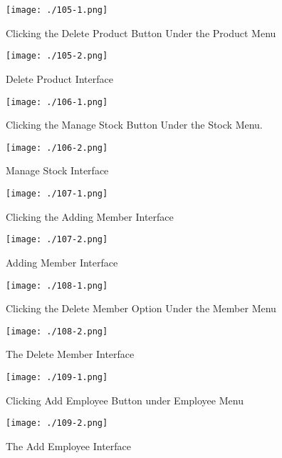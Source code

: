 \begin{figure}[H]
    \texttt{[image: ./105-1.png]}
    \caption{Clicking the Delete Product Button Under the Product Menu} \label{fig:105-1}
\end{figure}

\begin{figure}[H]
    \texttt{[image: ./105-2.png]}
    \caption{Delete Product Interface} \label{fig:105-2}
\end{figure}

\begin{figure}[H]
    \texttt{[image: ./106-1.png]}
    \caption{Clicking the Manage Stock Button Under the Stock Menu.} \label{fig:106-1}
\end{figure}

\begin{figure}[H]
    \texttt{[image: ./106-2.png]}
    \caption{Manage Stock Interface} \label{fig:106-2}
\end{figure}

\begin{figure}[H]
    \texttt{[image: ./107-1.png]}
    \caption{Clicking the Adding Member Interface} \label{fig:107-1}
\end{figure}

\begin{figure}[H]
    \texttt{[image: ./107-2.png]}
    \caption{Adding Member Interface} \label{fig:107-2}
\end{figure}

\begin{figure}[H]
    \texttt{[image: ./108-1.png]}
    \caption{Clicking the Delete Member Option Under the Member Menu} \label{fig:108-1}
\end{figure}

\begin{figure}[H]
    \texttt{[image: ./108-2.png]}
    \caption{The Delete Member Interface} \label{fig:108-2}
\end{figure}

\begin{figure}[H]
    \texttt{[image: ./109-1.png]}
    \caption{Clicking Add Employee Button under Employee Menu} \label{fig:109-1}
\end{figure}

\begin{figure}[H]
    \texttt{[image: ./109-2.png]}
    \caption{The Add Employee Interface} \label{fig:109-2}
\end{figure}

